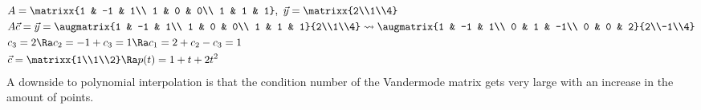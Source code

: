 \begin{align*}
    &A=\matrixx{1 & -1 & 1\\ 1 & 0 & 0\\ 1 & 1 & 1},\ \vec{y}=\matrixx{2\\1\\4}\\
    &A\vec{c}=\vec{y}=\augmatrix{1 & -1 & 1\\ 1 & 0 & 0\\ 1 & 1 & 1}{2\\1\\4}\leadsto\augmatrix{1 & -1 & 1\\ 0 & 1 & -1\\ 0 & 0 & 2}{2\\-1\\4}\\
    &c_3=2\Ra c_2=-1+c_3=1\Ra c_1=2+c_2-c_3=1\\
    &\vec{c}=\matrixx{1\\1\\2}\Ra p(t)=1+t+2t^2
\end{align*}
A downside to polynomial interpolation is that the condition number of the Vandermode matrix gets very large with an increase in the amount of points.
